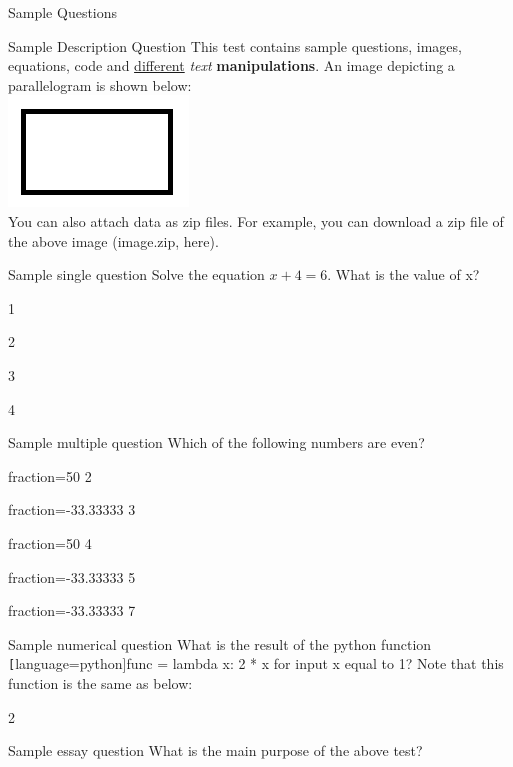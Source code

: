 \documentclass[12pt]{article}
\begin{document}
\begin{quiz}{Sample Questions}

\begin{description}{Sample Description Question}
This test contains sample questions, images, equations, code and \underline{different} \textit{text} \textbf{manipulations}. An image depicting a parallelogram is shown below:\\
\includegraphics{image.png}\\
You can also attach data as zip files. For example, you can download a zip file of the above image ({{image.zip, here}}).
\end{description}

\begin{singlechoice}{Sample single question}
Solve the equation ${x + 4 = 6}$. What is the value of x?
\item 1
\item* 2
\item 3
\item 4
\end{singlechoice}

\begin{multichoice}{Sample multiple question}
Which of the following numbers are even?
\item[fraction=50] 2
\item[fraction=-33.33333] 3
\item[fraction=50] 4
\item[fraction=-33.33333] 5
\item[fraction=-33.33333] 7
\end{multichoice}

\begin{numerical}{Sample numerical question}
What is the result of the python function \texttt[language=python]{func = lambda x: 2 * x} for input x equal to 1? Note that this function is the same as below:

\item 2
\end{numerical}

\begin{essay}{Sample essay question}
What is the main purpose of the above test?
\end{essay}

\end{quiz}
\end{document}
